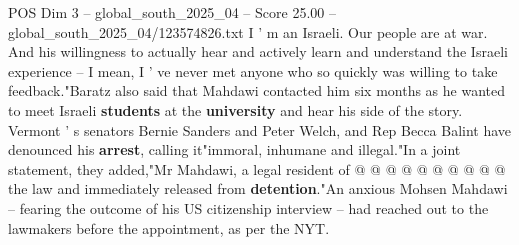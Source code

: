 \begin{textsample}{POS Dim 3 – global\_south\_2025\_04 – Score 25.00 – global\_south\_2025\_04/123574826.txt}
I ' m an Israeli.
Our people are at war.
And his willingness to actually hear and actively learn and understand the Israeli experience -- I mean, I ' ve never met anyone who so quickly was willing to take feedback."Baratz also said that Mahdawi contacted him six months as he wanted to meet Israeli \textbf{students} at the \textbf{university} and hear his side of the story.
Vermont ' s senators Bernie Sanders and Peter Welch, and Rep Becca Balint have denounced his \textbf{arrest}, calling it"immoral, inhumane and illegal."In a joint statement, they added,"Mr Mahdawi, a legal resident of @ @ @ @ @ @ @ @ @ @ the law and immediately released from \textbf{detention}."An anxious Mohsen Mahdawi -- fearing the outcome of his US citizenship interview -- had reached out to the lawmakers before the appointment, as per the NYT.

\end{textsample}
